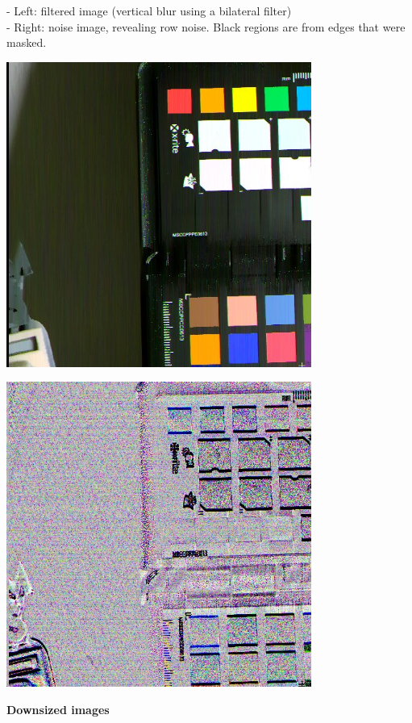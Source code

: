 - Left: filtered image (vertical blur using a bilateral filter)\\
- Right: noise image, revealing row noise. Black regions are from edges that were masked.\\ 

\begin{center}
\includegraphics[height=10cm]{images/10ms+4-fixrn-dbg-denoised-crop}
\end{center}

\begin{center}
\includegraphics[height=10cm]{images/10ms+4-fixrn-dbg-noise-crop}
\end{center}

\textbf{Downsized images}\\

